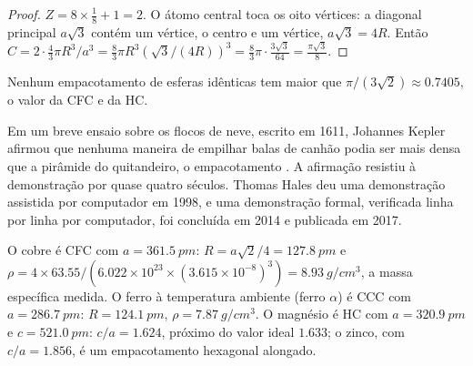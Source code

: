 \begin{proof}
$Z = 8 \times \frac18 + 1 = 2$. O átomo central toca os oito vértices: a
diagonal principal $a\sqrt3$ contém um vértice, o centro e um vértice,
$a\sqrt3 = 4R$. Então $C = 2 \cdot \frac43\pi R^3/a^3 =
\frac83\pi R^3 (\sqrt3/(4R))^3 = \frac83\pi \cdot \frac{3\sqrt3}{64} =
\frac{\pi\sqrt3}{8}$.
\end{proof}

\begin{proposition}\label{prop:b1:crystals-metals:kepler}
Nenhum empacotamento de esferas idênticas tem  maior que
$\pi/(3\sqrt2) \approx 0.7405$, o valor da CFC e da HC.
\end{proposition}
\admitted

\begin{history}
Em um breve ensaio sobre os flocos de neve, escrito em 1611, Johannes
Kepler afirmou que nenhuma maneira de empilhar balas de canhão podia ser
mais densa que a pirâmide do quitandeiro, o empacotamento . A afirmação resistiu à demonstração por quase quatro séculos.
Thomas Hales deu uma demonstração assistida por computador em 1998, e uma
demonstração formal, verificada linha por linha por computador, foi
concluída em 2014 e publicada em 2017.
\end{history}

\begin{example}\label{ex:b1:crystals-metals:metals}
O cobre é CFC com $a = \qty{361.5}{pm}$: $R = a\sqrt2/4 =
\qty{127.8}{pm}$ e $\rho = 4 \times 63.55/(6.022 \times 10^{23} \times
(3.615 \times 10^{-8})^3) = \qty{8.93}{g/cm^3}$, a massa específica medida.
O ferro à temperatura ambiente (ferro $\alpha$) é CCC com $a = \qty{286.7}{pm}$:
$R = \qty{124.1}{pm}$, $\rho = \qty{7.87}{g/cm^3}$. O magnésio é HC com
$a = \qty{320.9}{pm}$ e $c = \qty{521.0}{pm}$: $c/a = 1.624$, próximo do
valor ideal $1.633$; o zinco, com $c/a = 1.856$, é um empacotamento
hexagonal alongado.
\end{example}

